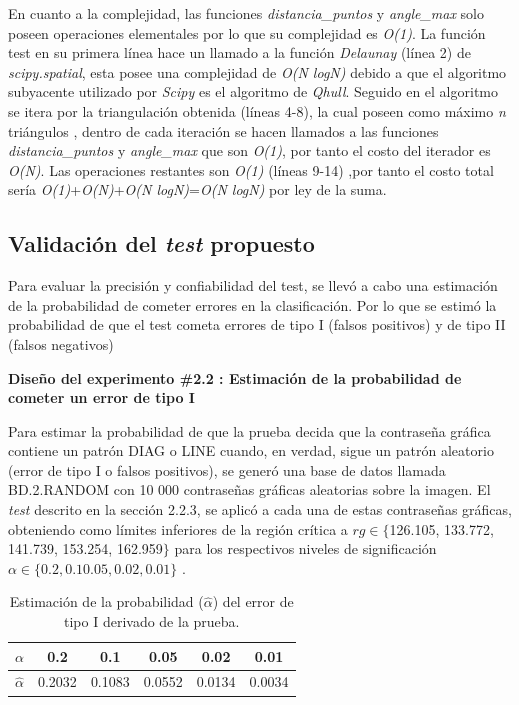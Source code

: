 \documentclass[12pt]{report}
\begin{document}
En cuanto a la complejidad, las funciones \textit{distancia\_puntos} y \textit{angle\_max} solo poseen operaciones elementales por lo que su complejidad es \textit{O(1)}. La función test en su primera línea hace un llamado a la función  \textit{Delaunay} (línea 2) de \textit{scipy.spatial}, esta posee una complejidad de \textit{O(N logN)} debido a que el algoritmo subyacente utilizado por \textit{Scipy} es el algoritmo de \textit{Qhull}. Seguido en el algoritmo se itera por la triangulación obtenida (líneas 4-8), la cual poseen como máximo \textit{n} triángulos , dentro de cada iteración se hacen llamados a las  funciones \textit{distancia\_puntos} y \textit{angle\_max}  que son \textit{O(1)}, por tanto el costo del iterador es \textit{O(N)}. Las operaciones restantes son \textit{O(1)} (líneas 9-14) ,por tanto el costo total sería \textit{O(1)}+\textit{O(N)}+\textit{O(N logN)}=\textit{O(N logN)} por ley de la suma.

\subsection{Validación del \textit{test} propuesto}

Para evaluar la precisión y confiabilidad del test, se llevó a cabo una estimación de la probabilidad de cometer errores en la clasificación. Por lo que se estimó la probabilidad de que el test cometa  errores de tipo I (falsos positivos) y de tipo II (falsos negativos)

\textbf{Diseño del experimento \#2.2 : Estimación de la probabilidad de cometer un error de tipo I} 

Para estimar la probabilidad de que la prueba decida que la contraseña gráfica contiene un patrón DIAG o LINE cuando, en verdad, sigue un patrón aleatorio (error de tipo I o falsos positivos), se generó una base de datos llamada BD.2.RANDOM con 10 000 contraseñas gráficas aleatorias sobre la imagen. El \textit{test} descrito en la sección 2.2.3, se aplicó a cada una de estas contraseñas gráficas, obteniendo como límites inferiores de la región crítica a  $rg \in \{$126.105, 133.772, 141.739, 153.254, 162.959$\}$ para los respectivos  niveles de significación $\alpha \in \{0.2, 0.1 0.05, 0.02 , 0.01\}$ .

\begin{table}[h!]
	\centering
	\begin{tabular}{|c|ccccc|}
		\hline
		$\alpha$ &  0.2 & 0.1 & 0.05 & 0.02 &  0.01 \\
		\hline
		$\hat{\alpha}$ & 0.2032 & 0.1083 & 0.0552 & 0.0134 & 0.0034 \\
		\hline
	\end{tabular}
	\caption{Estimación de la probabilidad ($\hat{\alpha}$) del error de tipo I derivado de la prueba.}
	\label{tab:error1-prob1}
\end{table}
\end{document}
